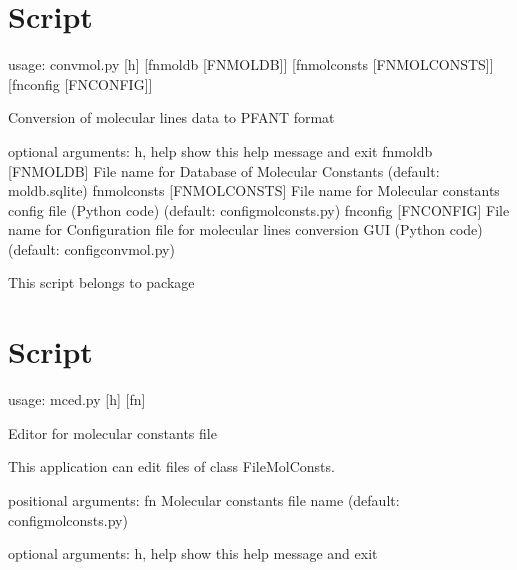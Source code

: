 \documentclass[letterpaper,10pt,english]{sphinxmanual}
\begin{document}
\section{Script }
\label{\detokenize{autoscripts/script-convmol::doc}}\label{\detokenize{autoscripts/script-convmol:script-convmol-py}}
\begin{sphinxVerbatim}[commandchars=\\\{\}]
usage: convmol.py [\PYGZhy{}h] [\PYGZhy{}\PYGZhy{}fn\PYGZus{}moldb [FN\PYGZus{}MOLDB]] [\PYGZhy{}\PYGZhy{}fn\PYGZus{}molconsts [FN\PYGZus{}MOLCONSTS]]
                  [\PYGZhy{}\PYGZhy{}fn\PYGZus{}config [FN\PYGZus{}CONFIG]]

Conversion of molecular lines data to PFANT format

optional arguments:
  \PYGZhy{}h, \PYGZhy{}\PYGZhy{}help            show this help message and exit
  \PYGZhy{}\PYGZhy{}fn\PYGZus{}moldb [FN\PYGZus{}MOLDB]
                        File name for Database of Molecular Constants
                        (default: moldb.sqlite)
  \PYGZhy{}\PYGZhy{}fn\PYGZus{}molconsts [FN\PYGZus{}MOLCONSTS]
                        File name for Molecular constants config file (Python
                        code) (default: configmolconsts.py)
  \PYGZhy{}\PYGZhy{}fn\PYGZus{}config [FN\PYGZus{}CONFIG]
                        File name for Configuration file for molecular lines
                        conversion GUI (Python code) (default:
                        configconvmol.py)
\end{sphinxVerbatim}

This script belongs to package 


\section{Script }
\label{\detokenize{autoscripts/script-mced::doc}}\label{\detokenize{autoscripts/script-mced:script-mced-py}}
\begin{sphinxVerbatim}[commandchars=\\\{\}]
usage: mced.py [\PYGZhy{}h] [fn]

Editor for molecular constants file

This application can edit files of class FileMolConsts.

positional arguments:
  fn          Molecular constants file name (default: configmolconsts.py)

optional arguments:
  \PYGZhy{}h, \PYGZhy{}\PYGZhy{}help  show this help message and exit
\end{sphinxVerbatim}
\end{document}
